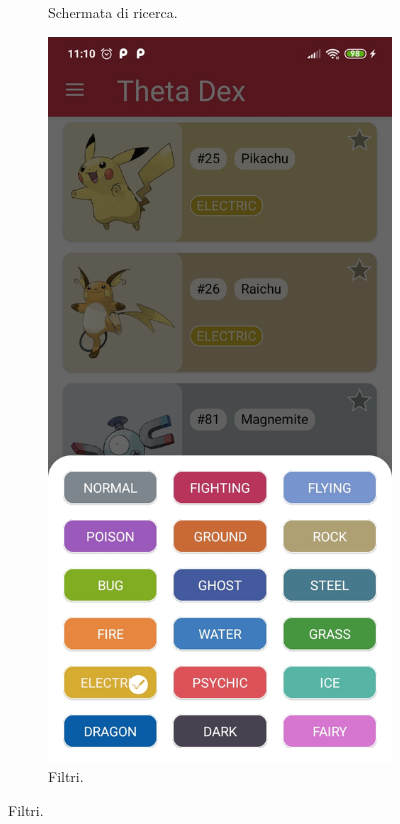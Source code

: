 \documentclass[a4paper,11pt]{article}
\begin{document}
\begin{figure}[h!]
{\begin{subfigure}[b]{0.3\linewidth}
    \caption{Schermata di ricerca.}
  \end{subfigure}
    \begin{subfigure}[b]{0.3\linewidth}
    \includegraphics[width=\linewidth]{filter.jpg}
    \caption{Filtri.}
  \end{subfigure}
  \label{fig:home}
  }
\end{figure}
\newpage
\end{document}

